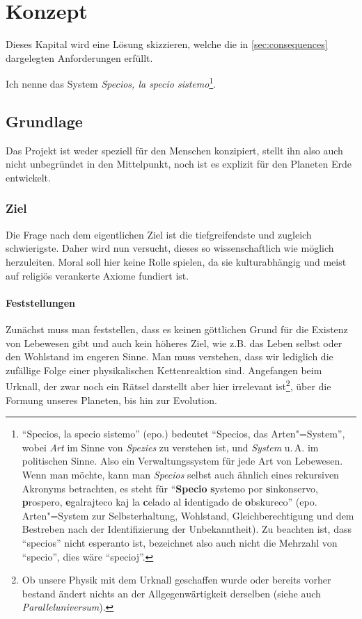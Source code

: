 \chapter{Konzept}\label{chap:concept}

Dieses Kapital wird eine Lösung skizzieren, welche die in \vref{sec:consequences} dargelegten Anforderungen erfüllt.

Ich nenne das System \textit{Specios, la specio sistemo}\footnote{"`Specios, la specio sistemo"' (epo.) bedeutet "`Specios, das Arten"=System"', wobei \textit{Art} im Sinne von \textit{Spezies} zu verstehen ist, und \textit{System} u.\,A. im politischen Sinne. Also ein Verwaltungssystem für jede Art von Lebewesen. Wenn man möchte, kann man \textit{Specios} selbst auch ähnlich eines rekursiven Akronyms betrachten, es steht für "`\textbf{Specio} \textbf{s}ystemo por \textbf{s}inkonservo, \textbf{p}rospero, \textbf{e}galrajteco kaj la \textbf{c}elado al \textbf{i}dentigado de \textbf{o}bskureco"' (epo. Arten"=System zur Selbsterhaltung, Wohlstand, Gleichberechtigung und dem Bestreben nach der Identifizierung der Unbekanntheit). Zu beachten ist, dass "`specios"' nicht esperanto ist, bezeichnet also auch nicht die Mehrzahl von "`specio"', dies wäre "`specioj"'.}.

\section{Grundlage}\label{sec:basis}

Das Projekt ist weder speziell für den Menschen konzipiert, stellt ihn also auch nicht unbegründet in den Mittelpunkt, noch ist es explizit für den Planeten Erde entwickelt.

\subsection{Ziel}\label{sec:basis/aim}

Die Frage nach dem eigentlichen Ziel ist die tiefgreifendste und zugleich schwierigste. Daher wird nun versucht, dieses so wissenschaftlich wie möglich herzuleiten. Moral soll hier keine Rolle spielen, da sie kulturabhängig und meist auf religiös verankerte Axiome fundiert ist.

\subsubsection{Feststellungen}

Zunächst muss man feststellen, dass es keinen göttlichen Grund für die Existenz von Lebewesen gibt und auch kein höheres Ziel, wie z.B. das Leben selbst oder den Wohlstand im engeren Sinne. Man muss verstehen, dass wir lediglich die zufällige Folge einer physikalischen Kettenreaktion sind. Angefangen beim Urknall, der zwar noch ein Rätsel darstellt aber hier irrelevant ist\footnote{Ob unsere Physik mit dem Urknall geschaffen wurde oder bereits vorher bestand ändert nichts an der Allgegenwärtigkeit derselben (siehe auch \textit{Paralleluniversum}).}, über die Formung unseres Planeten, bis hin zur Evolution.

